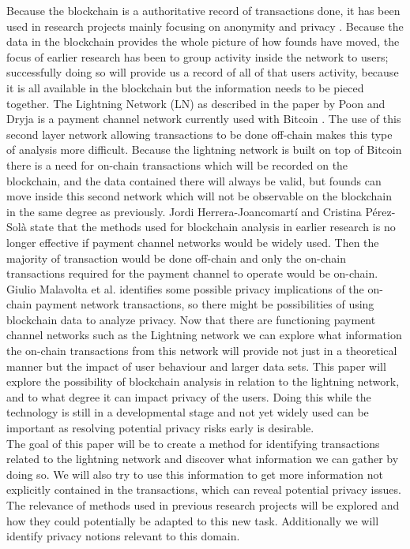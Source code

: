 Because the blockchain is a authoritative record of transactions done, it has been used in research projects mainly focusing on anonymity and privacy \cite{reid2013analysis} \cite{meiklejohn2013fistful}. Because the data in the blockchain provides the whole picture of how founds have moved, the focus of earlier research has been to group activity inside the network to users; successfully doing so will provide us a record of all of that users activity, because it is all available in the blockchain but the information needs to be pieced together.
The Lightning Network (LN) as described in the paper by Poon and Dryja \cite{poon2015bitcoin} is a payment channel network currently used with Bitcoin . The use of this second layer network allowing transactions to be done off-chain makes this type of analysis more difficult. Because the lightning network is built on top of Bitcoin there is a need for on-chain transactions which will be recorded on the blockchain, and the data contained there will always be valid, but founds can move inside this second network which will not be observable on the blockchain in the same degree as previously. Jordi Herrera-Joancomartí and Cristina Pérez-Solà \cite{herrera2015research} state that the methods used for blockchain analysis in earlier research is no longer effective if payment channel networks would be widely used. Then the majority of transaction would be done off-chain and only the on-chain transactions required for the payment channel to operate would be on-chain. Giulio Malavolta et al. \cite{malavolta2017concurrency} identifies some possible privacy implications of the on-chain payment network transactions, so there might be possibilities of using blockchain data to analyze privacy. Now that there are functioning payment channel networks such as the Lightning network we can explore what information the on-chain transactions from this network will provide not just in a theoretical manner but the impact of user behaviour and larger data sets. This paper will explore the possibility of blockchain analysis in relation to the lightning network, and to what degree it can impact privacy of the users. Doing this while the technology is still in a developmental stage and not yet widely used can be important as resolving potential privacy risks early is desirable.
\\

The goal of this paper will be to create a method for identifying transactions related to the lightning network and discover what information we can gather by doing so. We will also try to use this information to get more information not explicitly contained in the transactions, which can reveal potential privacy issues. 
The relevance of methods used in previous research projects \cite{reid2013analysis} \cite{meiklejohn2013fistful} will be explored and how they could potentially be adapted to this new task. Additionally we will identify privacy notions relevant to this domain.